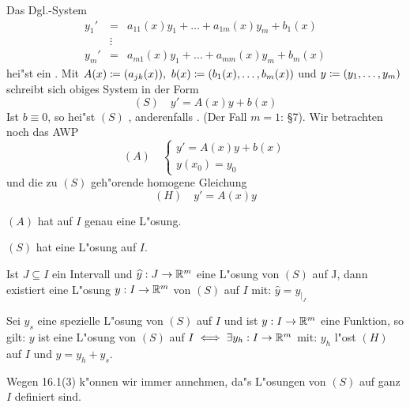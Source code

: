 \documentclass[a4paper,twoside,DIV15,BCOR12mm]{scrbook}
\begin{document}
Das Dgl.-System
\begin{eqnarray*}
y_1'&=&a_{11}(x)y_1 + \ldots + a_{1m}(x)y_m + b_1(x)\\
&\vdots &\\
y_m'&=&a_{m1}(x)y_1 + \ldots + a_{mm}(x)y_m + b_m(x)
\end{eqnarray*}
hei"st ein . Mit $A(x)\da (a_{jk}(x)),\ b(x)\da (b_1(x),\ldots,b_m(x))$ und $y\da (y_1, \ldots, y_m)$
schreibt sich obiges System in der Form
\[
	(S)\quad y'=A(x)y+b(x)
\]
Ist $b\equiv 0$, so hei"st $(S)$ , anderenfalls . (Der Fall $m=1$: §7).
Wir betrachten noch das AWP
\[
	(A)\quad \begin{cases}
		y'=A(x)y+b(x)\\
		y(x_0)=y_0
	\end{cases}
\]
und die zu $(S)$ geh"orende homogene Gleichung
\[
	(H)\quad y'=A(x)y
\]

\begin{satz}
\begin{liste}
\item $(A)$ hat auf $I$ genau eine L"osung.
\item $(S)$ hat eine L"osung auf $I$.
\item Ist $J\subseteq I$ ein Intervall und $\widehat{y}:J\to\mathbb{R}^m$ eine L"osung von $(S)$ auf J, dann existiert eine L"osung $y:I\to\mathbb{R}^m$ von $(S)$ auf $I$ mit: $\widehat{y}=y_{|_J}$
\item Sei $y_s$ eine spezielle L"osung von $(S)$ auf $I$ und ist $y:I\to\mathbb{R}^m$ eine Funktion, so gilt: $y$ ist eine L"osung von $(S)$ auf $I\iff \exists y_h:I\to\mathbb{R}^m$ mit:
$y_h$ l"ost $(H)$ auf $I$ und $y=y_h+y_s$.
\end{liste}
\end{satz}

\begin{wichtigebemerkung}	
Wegen 16.1(3) k"onnen wir immer annehmen, da"s L"osungen von $(S)$ auf ganz $I$ definiert sind.
\end{wichtigebemerkung}
\end{document}
